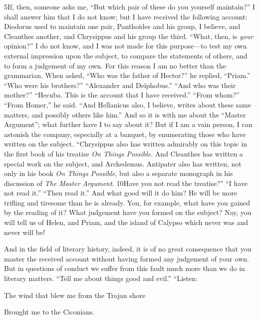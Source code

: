 5If, then, someone asks me, ``But which pair of these do you yourself maintain?'' I shall answer him that I do not know; but I have received the following account: Diodorus used to maintain one pair, Panthoides and his group, I believe, and Cleanthes another, and Chrysippus and his group the third. ``What, then, is \emph{your} opinion?'' I do not know, and I was not made for this purpose—to test my own external impression upon the subject, to compare the statements of others, and to form a judgement of my own. For this reason I am no better than the grammarian. When asked, ``Who was the father of Hector?'' he replied, ``Priam.'' ``Who were his brothers?'' ``Alexander and Deïphobus.'' ``And who was their mother?'' ``Hecuba. This is the account that I have received.'' ``From whom?'' ``From Homer,'' he said. ``And Hellanicus also, I believe, writes about these same matters, and possibly others like him.'' And so it is with me about the ``Master Argument''; what further have I to say about it? But if I am a vain person, I can astonish the company, especially at a banquet, by enumerating those who have written on the subject. ``Chrysippus also has written admirably on this topic in the first book of his treatise \emph{On Things Possible}. And Cleanthes has written a special work on the subject, and Archedemus. Antipater also has written, not only in his book \emph{On Things Possible}, but also a separate monograph in his discussion of \emph{The Master Argument}. 10Have you not read the treatise?'' ``I have not read it.'' ``Then read it.'' And what good will it do him? He will be more trifling and tiresome than he is already. You, for example, what have you gained by the reading of it? What judgement have you formed on the subject? Nay, you will tell us of Helen, and Priam, and the island of Calypso which never was and never will be!

And in the field of literary history, indeed, it is of no great consequence that you master the received account without having formed any judgement of your own. But in questions of conduct we suffer from this fault much more than we do in literary matters. ``Tell me about things good and evil.'' ``Listen:

The wind that blew me from the Trojan shore

Brought me to the Ciconians.

